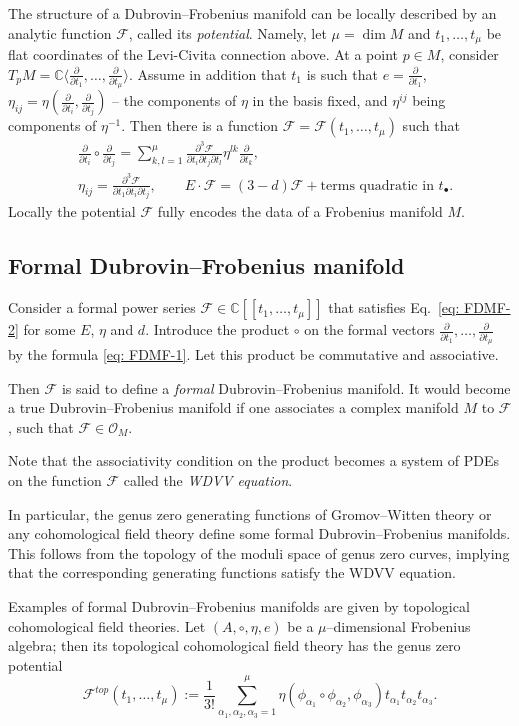 \documentclass[12pt,a4paper]{amsart}
\newcommand{\CC}{{\mathbb{C}}}
\newcommand{\F}[2]{{F_{#1}^{#2}}}
\def\F{{\mathcal F}}
\def\O{{\mathcal O}}
\newcommand{\p}{{\partial}}
\newcommand{\<}{\left<}
\renewcommand{\>}{\right>}
\numberwithin{equation}{section}
\begin{document}
The structure of a Dubrovin--Frobenius manifold can be locally described by an analytic function $\F$, called its \textit{potential}. Namely, let $\mu = \dim M$ and $t_1,\dots,t_\mu$ be flat coordinates of the Levi-Civita connection above. At a point $p \in M$, consider $T_pM = \CC \langle \frac{\p}{\p t_1} ,\dots,\frac{\p}{\p t_\mu}\rangle$. Assume in addition that $t_1$ is such that $e = \frac{\p}{\p t_1}$, $\eta_{ij} = \eta(\frac{\p}{\p t_i},\frac{\p}{\p t_j})$ -- the components of $\eta$ in the basis fixed, and $\eta^{ij}$ being components of $\eta^{-1}$. Then there is a function $\F=\F(t_1,\dots,t_\mu)$ such that
\begin{align}
    & \frac{\p}{\p t_i} \circ \frac{\p}{\p t_j} = \sum_{k,l=1}^\mu \frac{\p^3 \F}{\p t_i \p t_j \p t_l} \eta^{lk} \frac{\p}{\p t_k},
    \label{eq: FDMF-1}
    \\
    & \eta_{ij} = \frac{\p^3 \F}{\p t_1 \p t_i \p t_j}, \qquad E \cdot \F = (3 - d) \F + \text{terms quadratic in $t_\bullet$}. \label{eq: FDMF-2}
\end{align}
Locally the potential $\F$ fully encodes the data of a Frobenius manifold $M$.

\subsection{Formal Dubrovin--Frobenius manifold}\label{subsection: formal Dubrovin--Frobenius manifold}
Consider a formal power series $\F \in \CC[[t_1,\dots,t_\mu]]$ that satisfies Eq.~\eqref{eq: FDMF-2} for some $E$, $\eta$ and $d$. Introduce the product $\circ$ on the formal vectors $\frac{\p}{\p t_1},\dots, \frac{\p}{\p t_\mu}$ by the formula \eqref{eq: FDMF-1}. Let this product be commutative and associative.

Then $\F$ is said to define a \textit{formal} Dubrovin--Frobenius manifold. It would become a true Dubrovin--Frobenius manifold if one associates a complex manifold $M$ to $\F$, such that $\F \in \O_M$.

Note that the associativity condition on the product becomes a system of PDEs on the function $\F$ called the \textit{WDVV equation}.

In particular, the genus zero generating functions of Gromov--Witten theory or any cohomological field theory define some formal Dubrovin--Frobenius manifolds. This follows from the topology of the moduli space of genus zero curves, implying that the corresponding generating functions satisfy the WDVV equation.

Examples of formal Dubrovin--Frobenius manifolds are given by topological cohomological field theories. Let $(A,\circ,\eta,e)$ be a $\mu$--dimensional Frobenius algebra; then its topological cohomological field theory has the genus zero potential
\[
    \F^{top}(t_1,\dots,t_\mu)
    := \frac{1}{3!} \sum_{\alpha_1,\alpha_2,\alpha_3 = 1}^\mu \eta (\phi_{\alpha_1} \circ \phi_{\alpha_2},\phi_{\alpha_3}) t_{\alpha_1}t_{\alpha_2}t_{\alpha_3}.
\]
\end{document}
